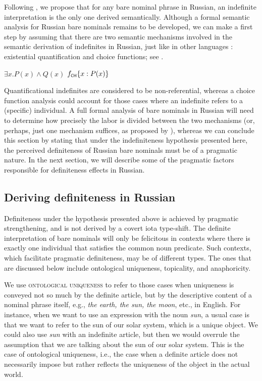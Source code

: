\documentclass[output=paper,
colorlinks,
citecolor=brown,
newtxmath
]{langscibook}
\begin{document}
\noindent Following \citet{Heim2011}, we propose that for any bare nominal phrase in Russian, an indefinite interpretation is the only one derived semantically. Although a formal semantic analysis for Russian bare nominals remains to be developed, we can make a first step by assuming that there are two semantic mechanisms involved in the semantic derivation of indefinites in Russian, just like in other languages \citep{reinhart97}: existential quantification and choice functions; see .

\ea \label{indef}
\ea $\exists x . P(x) \wedge Q(x)$
\ex $f_{\cnst{ch}}\{x: P(x)\}$
\z \z

\noindent Quantificational indefinites are considered to be non-referential, whereas a choice function analysis could account for those cases where an indefinite refers to a (specific) individual. A full formal analysis of bare nominals in Russian will need to determine how precisely the labor is divided between the two mechanisms (or, perhaps, just one mechanism suffices, as proposed by \citealt{Winter97}), whereas we can conclude this section by stating that under the indefiniteness hypothesis presented here, the perceived definiteness of Russian bare nominals must be of a pragmatic nature. In the next section, we will describe some of the pragmatic factors responsible for definiteness effects in Russian.

\subsection{Deriving definiteness in Russian}
Definiteness under the hypothesis presented above is achieved by pragmatic strengthening, and is not derived by a covert iota type-shift. The definite interpretation of bare nominals will only be felicitous in contexts where there is exactly one individual that satisfies the common noun predicate. Such contexts, which facilitate pragmatic definiteness, may be of different types. The ones that are discussed below include ontological uniqueness, topicality, and anaphoricity.

We use \textsc{ontological uniqueness} to refer to those cases when uniqueness is conveyed not so much by the definite article, but by the descriptive content of a nominal phrase itself, e.g.,
\textit{the earth, the sun, the moon}, etc., in English. For instance, when we want to use an expression with the noun \textit{sun}, a usual case is that we want to refer to the sun of our solar system, which is a unique object. We could also use \textit{sun} with an indefinite article, but then we would overrule the assumption that we are talking about the sun of our solar system. This is the case of ontological uniqueness, i.e., the case when a definite article does not necessarily impose but rather reflects the uniqueness of the object in the actual world.
\end{document}
